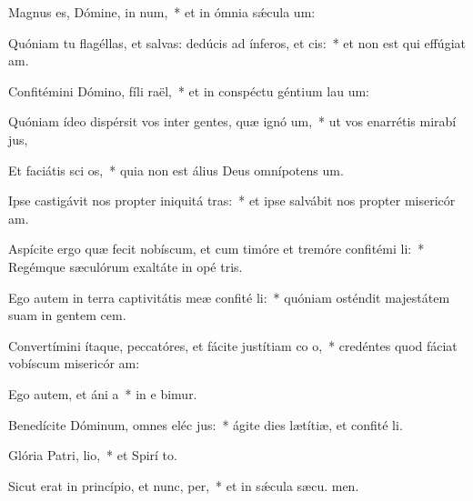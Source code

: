 \item Magnus es, Dómine, in num,~* et in ómnia sǽcula  um:
\item Quóniam tu flagéllas, et salvas: dedúcis ad ínferos, et cis:~* et non est qui effúgiat  am.
\item Confitémini Dómino, fíli raël,~* et in conspéctu géntium lau um:
\item Quóniam ídeo dispérsit vos inter gentes, quæ ignó um,~* ut vos enarrétis mirabí jus,
\item Et faciátis sci os,~* quia non est álius Deus omnípotens  um.
\item Ipse castigávit nos propter iniquitá tras:~* et ipse salvábit nos propter misericór am.
\item Aspícite ergo quæ fecit nobíscum, et cum timóre et tremóre confitémi li:~* Regémque sæculórum exaltáte in opé tris.
\item Ego autem in terra captivitátis meæ confité li:~* quóniam osténdit majestátem suam in gentem cem.
\item Convertímini ítaque, peccatóres, et fácite justítiam co o,~* credéntes quod fáciat vobíscum misericór am:
\item Ego autem, et áni a~* in e bimur.
\item Benedícite Dóminum, omnes eléc jus:~* ágite dies lætítiæ, et confité li.
\item Glória Patri,  lio,~* et Spirí to.
\item Sicut erat in princípio, et nunc,  per,~* et in sǽcula sæcu. men.
